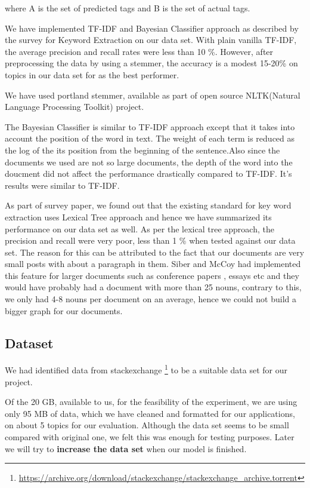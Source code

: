 \documentclass[dvips,9pt]{article}
\begin{document}
		where A is the set of predicted tags and B is the set of actual tags.
		
		We have implemented TF-IDF and Bayesian Classifier approach as described by the survey for Keyword Extraction on our data set. With plain vanilla TF-IDF, the average precision and recall rates were less than 10 \%. However, after preprocessing the data by using a stemmer, the accuracy is a modest 15-20\% on topics in our data set for as the best performer. 
		
		We have used portland stemmer, available as part of open source NLTK(Natural Language Processing Toolkit) project.
		
		The Bayesian Classifier is similar to TF-IDF approach except that it takes into account the position of the word in text. The weight of each term is reduced as the log of the its position from the beginning of the sentence.Also since the documents we used are not so large documents, the depth of the word into the doucment did not affect the performance drastically compared to TF-IDF. It's results were similar to TF-IDF. 
		
				
		As part of survey paper\cite{lott2012survey}, we found out that the existing standard for key word extraction uses Lexical Tree approach and hence we have summarized its performance on our data set as well. As per the lexical tree approach, the precision and recall were very poor, less than 1 \% when tested against our data set. The reason for this can be attributed to the fact that our documents are very small posts with about a paragraph in them. Siber and McCoy\cite{silber2002efficiently} had implemented this feature for larger documents such as conference papers , essays etc and they would have probably had a document with more than 25 nouns, contrary to this, we only had 4-8 nouns per document on an average, hence we could not build a bigger graph for our documents. 
		
		\subsection{Dataset}
		
		We had identified data from stackexchange \footnote{\url{https://archive.org/download/stackexchange/stackexchange_archive.torrent}} to be a suitable data set for our project. 
		
		Of the 20 GB, available to us, for the feasibility of the experiment, we are using only 95 MB of data, which we have cleaned and formatted for our applications, on about 5 topics for our evaluation. Although the data set seems to be small compared with original one, we felt this was enough for testing purposes. Later we will try to \textbf{increase the data set} when our model is finished.
        
\end{document}
